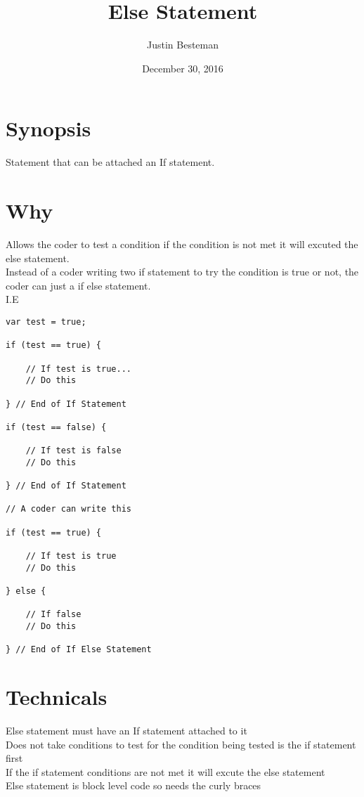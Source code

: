 \documentclass[12pt, letterpaper]{article}
\title{Else Statement}
\author{Justin Besteman}
\date{December 30, 2016}
\begin{document}
\maketitle


\section*{Synopsis}

Statement that can be attached an If statement. \\


\section*{Why}

Allows the coder to test a condition if the condition is not met it will excuted the else statement. \\
Instead of a coder writing two if statement to try the condition is true or not, the coder can just a if else statement. \\
I.E
\begin{lstlisting}
var test = true;

if (test == true) {

	// If test is true...
	// Do this

} // End of If Statement

if (test == false) {

	// If test is false
	// Do this

} // End of If Statement

// A coder can write this

if (test == true) {

	// If test is true
	// Do this

} else {

	// If false
	// Do this

} // End of If Else Statement
\end{lstlisting}

\section*{Technicals}

Else statement must have an If statement attached to it \\
Does not take conditions to test for the condition being tested is the if statement first \\ 
If the if statement conditions are not met it will excute the else statement \\
Else statement is block level code so needs the curly braces 
\end{document}
